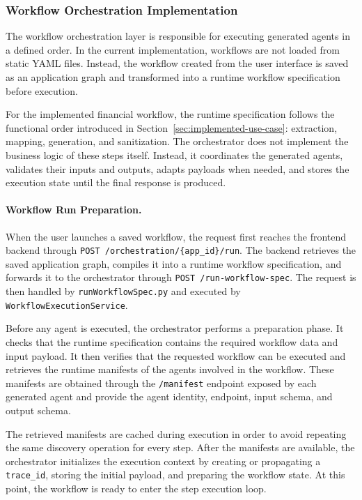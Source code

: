 \subsubsection{Workflow Orchestration Implementation}
\label{sec:workflow-orchestration-implementation}

The workflow orchestration layer is responsible for executing generated agents in a defined order. In the current implementation, workflows are not loaded from static YAML files. Instead, the workflow created from the user interface is saved as an application graph and transformed into a runtime workflow specification before execution.

For the implemented financial workflow, the runtime specification follows the functional order introduced in Section~\ref{sec:implemented-use-case}: extraction, mapping, generation, and sanitization. The orchestrator does not implement the business logic of these steps itself. Instead, it coordinates the generated agents, validates their inputs and outputs, adapts payloads when needed, and stores the execution state until the final response is produced.

\paragraph{Workflow Run Preparation.}

When the user launches a saved workflow, the request first reaches the frontend backend through \texttt{POST /orchestration/\{app\_id\}/run}. The backend retrieves the saved application graph, compiles it into a runtime workflow specification, and forwards it to the orchestrator through \texttt{POST /run-workflow-spec}. The request is then handled by \texttt{runWorkflowSpec.py} and executed by \texttt{WorkflowExecutionService}.

Before any agent is executed, the orchestrator performs a preparation phase. It checks that the runtime specification contains the required workflow data and input payload. It then verifies that the requested workflow can be executed and retrieves the runtime manifests of the agents involved in the workflow. These manifests are obtained through the \texttt{/manifest} endpoint exposed by each generated agent and provide the agent identity, endpoint, input schema, and output schema.

The retrieved manifests are cached during execution in order to avoid repeating the same discovery operation for every step. After the manifests are available, the orchestrator initializes the execution context by creating or propagating a \texttt{trace\_id}, storing the initial payload, and preparing the workflow state. At this point, the workflow is ready to enter the step execution loop.

